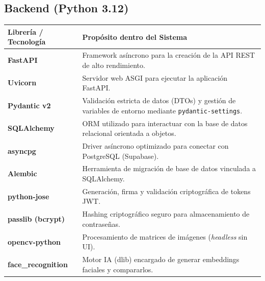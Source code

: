\documentclass[12pt,a4paper]{article}
\begin{document}
\subsection{Backend (Python 3.12)}
\begin{table}[h]
    \centering
    \begin{tabularx}{\textwidth}{|l|X|}
        \hline
        \textbf{Librería / Tecnología} & \textbf{Propósito dentro del Sistema} \\
        \hline
        \textbf{FastAPI} & Framework asíncrono para la creación de la API REST de alto rendimiento. \\
        \hline
        \textbf{Uvicorn} & Servidor web ASGI para ejecutar la aplicación FastAPI. \\
        \hline
        \textbf{Pydantic v2} & Validación estricta de datos (DTOs) y gestión de variables de entorno mediante \texttt{pydantic-settings}. \\
        \hline
        \textbf{SQLAlchemy} & ORM utilizado para interactuar con la base de datos relacional orientada a objetos. \\
        \hline
        \textbf{asyncpg} & Driver asíncrono optimizado para conectar con PostgreSQL (Supabase). \\
        \hline
        \textbf{Alembic} & Herramienta de migración de base de datos vinculada a SQLAlchemy. \\
        \hline
        \textbf{python-jose} & Generación, firma y validación criptográfica de tokens JWT. \\
        \hline
        \textbf{passlib (bcrypt)} & Hashing criptográfico seguro para almacenamiento de contraseñas. \\
        \hline
        \textbf{opencv-python} & Procesamiento de matrices de imágenes (\textit{headless} sin UI). \\
        \hline
        \textbf{face\_recognition} & Motor IA (dlib) encargado de generar embeddings faciales y compararlos. \\
        \hline
    \end{tabularx}
\end{table}
\end{document}

